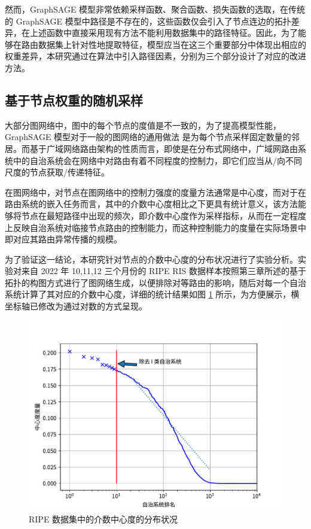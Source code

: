 然而，GraphSAGE 模型非常依赖采样函数、聚合函数、损失函数的选取，在传统的 GraphSAGE 模型中路径是不存在的，这些函数仅会引入了节点连边的拓扑差异，在上述函数中直接采用现有方法不能利用数据集中的路径特征。因此，为了能够在路由数据集上针对性地提取特征，模型应当在这三个重要部分中体现出相应的权重差异，本研究通过在算法中引入路径因素，分别为三个部分设计了对应的改进方法。

\subsection{基于节点权重的随机采样}

大部分图网络中，图中的每个节点的度值是不一致的，为了提高模型性能，GraphSAGE 模型对于一般的图网络的通用做法 是为每个节点采样固定数量的邻居。而基于广域网络路由架构的性质而言，即使是在分布式网络中，广域网路由系统中的自治系统会在网络中对路由有着不同程度的控制力，即它们应当从/向不同尺度的节点获取/传递特征。

在图网络中，对节点在图网络中的控制力强度的度量方法通常是中心度，而对于在路由系统的嵌入任务而言，其中的介数中心度相比之下更具有统计意义，该方法能够将节点在最短路径中出现的频次，即介数中心度作为采样指标，从而在一定程度上反映自治系统对临接节点路由的控制能力，而这种控制能力的度量在实际场景中即对应其路由异常传播的规模。

为了验证这一结论，本研究针对节点的介数中心度的分布状况进行了实验分析。实验对来自 2022 年 10,11,12 三个月份的 RIPE RIS 数据样本按照第三章所述的基于拓扑的构图方式进行了图网络生成，以便排除对等路由的影响，随后对每一个自治系统计算了其对应的介数中心度，详细的统计结果如图 \ref{c4_node-centrality} 所示，为方便展示，横坐标轴已修改为通过对数的方式呈现。

\begin{figure}[h]
    \includegraphics[width=0.8\linewidth]{chapter/c4_images/c4_node-centrality.pdf}
    \caption{RIPE 数据集中的介数中心度的分布状况}
    \label{c4_node-centrality}
\end{figure}

